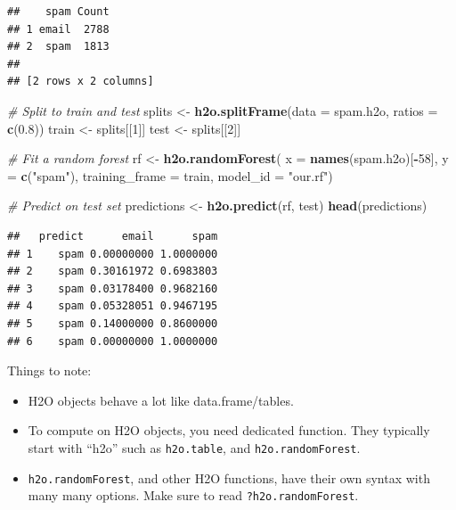 \documentclass[]{book}
\newenvironment{Shaded}{\begin{snugshade}}{\end{snugshade}}
\newcommand{\CommentTok}[1]{\textcolor[rgb]{0.56,0.35,0.01}{\textit{#1}}}
\newcommand{\DataTypeTok}[1]{\textcolor[rgb]{0.13,0.29,0.53}{#1}}
\newcommand{\DecValTok}[1]{\textcolor[rgb]{0.00,0.00,0.81}{#1}}
\newcommand{\FloatTok}[1]{\textcolor[rgb]{0.00,0.00,0.81}{#1}}
\newcommand{\KeywordTok}[1]{\textcolor[rgb]{0.13,0.29,0.53}{\textbf{#1}}}
\newcommand{\NormalTok}[1]{#1}
\newcommand{\OperatorTok}[1]{\textcolor[rgb]{0.81,0.36,0.00}{\textbf{#1}}}
\newcommand{\StringTok}[1]{\textcolor[rgb]{0.31,0.60,0.02}{#1}}
\providecommand{\tightlist}{%
  \setlength{\itemsep}{0pt}\setlength{\parskip}{0pt}}
\theoremstyle{definition}
\theoremstyle{definition}
\theoremstyle{definition}
\theoremstyle{remark}
\begin{document}
\begin{Shaded}
\end{Shaded}

\begin{verbatim}
##    spam Count
## 1 email  2788
## 2  spam  1813
## 
## [2 rows x 2 columns]
\end{verbatim}

\begin{Shaded}
\begin{Highlighting}[]
\CommentTok{# Split to train and test}
\NormalTok{splits <-}\StringTok{ }\KeywordTok{h2o.splitFrame}\NormalTok{(}\DataTypeTok{data =}\NormalTok{ spam.h2o, }\DataTypeTok{ratios =} \KeywordTok{c}\NormalTok{(}\FloatTok{0.8}\NormalTok{))}
\NormalTok{train <-}\StringTok{ }\NormalTok{splits[[}\DecValTok{1}\NormalTok{]]}
\NormalTok{test <-}\StringTok{ }\NormalTok{splits[[}\DecValTok{2}\NormalTok{]]}

\CommentTok{# Fit a random forest}
\NormalTok{rf <-}\StringTok{ }\KeywordTok{h2o.randomForest}\NormalTok{(}
  \DataTypeTok{x =} \KeywordTok{names}\NormalTok{(spam.h2o)[}\OperatorTok{-}\DecValTok{58}\NormalTok{],}
  \DataTypeTok{y =} \KeywordTok{c}\NormalTok{(}\StringTok{"spam"}\NormalTok{),}
  \DataTypeTok{training_frame =}\NormalTok{ train,}
  \DataTypeTok{model_id =} \StringTok{"our.rf"}\NormalTok{)}

\CommentTok{# Predict on test set}
\NormalTok{predictions <-}\StringTok{ }\KeywordTok{h2o.predict}\NormalTok{(rf, test)}
\KeywordTok{head}\NormalTok{(predictions)}
\end{Highlighting}
\end{Shaded}

\begin{verbatim}
##   predict      email      spam
## 1    spam 0.00000000 1.0000000
## 2    spam 0.30161972 0.6983803
## 3    spam 0.03178400 0.9682160
## 4    spam 0.05328051 0.9467195
## 5    spam 0.14000000 0.8600000
## 6    spam 0.00000000 1.0000000
\end{verbatim}

Things to note:

\begin{itemize}
\tightlist
\item
  H2O objects behave a lot like data.frame/tables.
\item
  To compute on H2O objects, you need dedicated function. They typically start with ``h2o'' such as \texttt{h2o.table}, and \texttt{h2o.randomForest}.
\item
  \texttt{h2o.randomForest}, and other H2O functions, have their own syntax with many many options. Make sure to read \texttt{?h2o.randomForest}.
\end{itemize}
\end{document}
